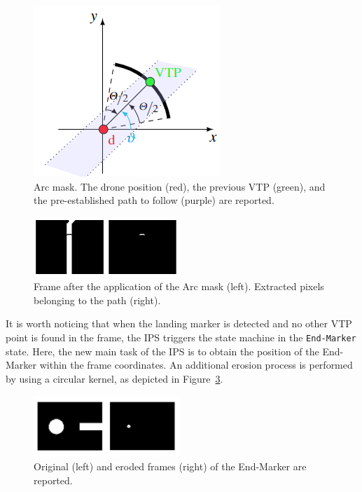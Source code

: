 \documentclass[a4paper,twocolumn,10pt]{article}
\begin{document}
    \begin{figure}
        \centering
        \includegraphics{pics/fig7_no.png}
        \caption{Arc mask. The drone position (red), the previous VTP (green), and the pre-established path to follow (purple) are reported.} 
        \label{fig:Arc_mask}
    \end{figure}

    \begin{figure}
        \centering
        \includegraphics[width=0.49\textwidth]{pics/fig8_frame.png}
        \caption{Frame after the application of the Arc mask (left). Extracted pixels belonging to the 
        path (right).}
        \label{fig:track}
    \end{figure}
    
    It is worth noticing that when the landing marker is detected and no other VTP point is found in the frame, the IPS triggers the state machine in the \texttt{End-Marker} state. Here, the new main task of the IPS is to obtain the position of the End-Marker within the frame coordinates. An additional erosion process is performed by using a circular kernel, as depicted in 
    Figure~\ref{fig:End_marker}. 
    
    \begin{figure}
        \centering
        \includegraphics[width=0.49\textwidth]{pics/fig9_frame.png}
        \caption{Original (left) and eroded frames (right) of the End-Marker are reported.}
        \label{fig:End_marker}
    \end{figure}
\end{document}
